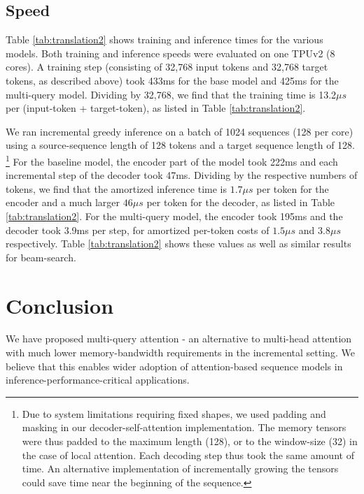 \subsection{Speed}

Table \ref{tab:translation2} shows training and inference times for the various models.  Both training and inference speeds were evaluated on one TPUv2 (8 cores).  A training step (consisting of 32,768 input tokens and 32,768 target tokens, as described above) took 433ms for the base model and 425ms for the multi-query model.  Dividing by 32,768, we find that the training time is 13.2$\mu s$ per (input-token + target-token), as listed in Table \ref{tab:translation2}.

We ran incremental greedy inference on a batch of 1024 sequences (128 per core) using a source-sequence length of 128 tokens and a target sequence length of 128.   \footnote{Due to system limitations requiring fixed shapes, we used padding and masking in our decoder-self-attention implementation.  The memory tensors were thus padded to the maximum length (128), or to the window-size (32) in the case of local attention.  Each decoding step thus took the same amount of time. An alternative implementation of incrementally growing the tensors could save time near the beginning of the sequence.}   For the baseline model, the encoder part of the model took 222ms and each incremental step of the decoder took 47ms.  Dividing by the respective numbers of tokens, we find that the amortized inference time is $1.7\mu s$ per token for the encoder and a much larger $46\mu s$ per token for the decoder, as listed in Table \ref{tab:translation2}.   For the multi-query model, the encoder took 195ms and the decoder took 3.9ms per step, for amortized per-token costs of $1.5\mu s$ and $3.8\mu s$ respectively.  Table \ref{tab:translation2} shows these values as well as similar results for beam-search.

\section{Conclusion}
We have proposed multi-query attention - an alternative to multi-head attention with much lower memory-bandwidth requirements in the incremental setting.  We believe that this enables wider adoption of attention-based sequence models in inference-performance-critical applications.


